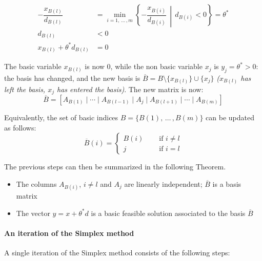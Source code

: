 \documentclass[english]{article}
\begin{document}
\begin{align*}
  - \dfrac{x_{B(l)}}{d_{B(l)}}    & = \min_{i=1, \, \ldots \,, m} \left\{ - \dfrac{x_{B(i)}}{d_{B(i)}} \,\middle\vert\, d_{B(i)} < 0 \right\} = \theta^\ast \\
  d_{B(l)}                        & < 0                                                                                                                     \\
  x_{B(l)} + \theta^\ast d_{B(l)} & = 0
\end{align*}

The basic variable \(x_{B(l)}\) is now \(0\), while the non basic variable \(x_j\) is \(y_j = \theta^\ast > 0\):
the basis has changed, and the new basis is \(\overline{B} = B \setminus \{ x_{B(l)} \} \cup \{ x_j \}\) \textit{(\(x_{B(l)}\) has left the basis, \(x_j\) has entered the basis)}.
The new matrix is now:
\[ \overline{B} = \left[ A_{B(1)} \mid  \cdots \mid A_{B(l-1)} \mid A_j \mid A_{B(l+1)} \mid \cdots \mid A_{B(m)} \right] \]

Equivalently, the set of basic indices \(B = \{ B(1), \, \ldots \,, B(m) \}\) can be updated as follows:
\[\overline{B}(i) = \begin{cases}
    B(i) \quad & \text{ if } i \neq l \\
    j \quad    & \text{ if } i = l
  \end{cases}\]

\bigskip
The previous steps can then be summarized in the following Theorem.

\begin{theorem}\hfill
  \begin{itemize}
    \item The columns \(A_{B(i)}\), \(i \neq l\) and \(A_j\) are linearly independent; \(\overline{B}\) is a basis matrix
    \item The vector \(y = x + \theta^\ast d\) is a basic feasible solution associated to the basis \(\overline{B}\)
  \end{itemize}
\end{theorem}

\paragraph{An iteration of the Simplex method}

A single iteration of the Simplex method consists of the following steps:
\end{document}
